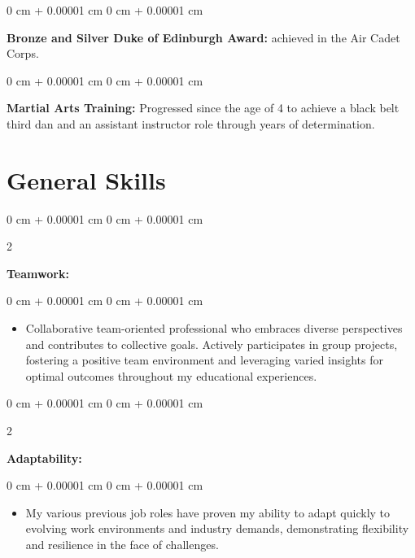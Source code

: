 \documentclass[10pt, letterpaper]{article}
\newenvironment{highlights}{
    \begin{itemize}[
        topsep=0.10 cm,
        parsep=0.10 cm,
        partopsep=0pt,
        itemsep=0pt,
        leftmargin=0 cm + 10pt
    ]
}{
    \end{itemize}
} %
\newenvironment{onecolentry}{
    \begin{adjustwidth}{
        0 cm + 0.00001 cm
    }{
        0 cm + 0.00001 cm
    }
}{
    \end{adjustwidth}
} %
\newenvironment{twocolentry}[2][]{
    \onecolentry
    \def\secondColumn{#2}
    \setcolumnwidth{\fill, 4.5 cm}
    \begin{paracol}{2}
}{
    \switchcolumn \raggedleft \secondColumn
    \end{paracol}
    \endonecolentry
} %
\begin{document}
            \begin{onecolentry}
            \textbf{Bronze and Silver Duke of Edinburgh Award:} achieved in the Air Cadet Corps. 
        \end{onecolentry}
          \vspace{0.05 cm}

        \begin{onecolentry}
            \textbf{Martial Arts Training:} Progressed since the age of 4 to achieve a black belt third dan and an assistant instructor role through years of determination.
        \end{onecolentry}
    
    

    \section{General Skills}
       

        \begin{twocolentry}{
            
        }
            \textbf{Teamwork:}\end{twocolentry}

        \vspace{-0.05 cm}
        \begin{onecolentry}
            \begin{highlights}
                \item Collaborative team-oriented professional who embraces diverse perspectives and contributes to collective goals. Actively participates in group projects, fostering a positive team environment and leveraging varied insights for optimal outcomes throughout my educational experiences.
                
            \end{highlights}
        \end{onecolentry}
\vspace{0.2 cm}

        \begin{twocolentry}{
            
        }
            \textbf{Adaptability:}\end{twocolentry}

        \vspace{-0.05 cm}
        \begin{onecolentry}
            \begin{highlights}
                \item My various previous job roles have proven my ability to adapt quickly to evolving work environments and industry demands, demonstrating flexibility and resilience in the face of challenges. 
                
            \end{highlights}
        \end{onecolentry}
        \vspace{0.2 cm}
\end{document}

